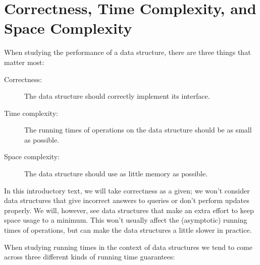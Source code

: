 \section{Correctness, Time Complexity, and Space Complexity}

When studying the performance of a data structure, there are three things that matter most:

\begin{description}
  \item[Correctness:] The data structure should correctly implement
    its interface.
  \item[Time complexity:] The running times of operations on the data
    structure should be as small as possible.
  \item[Space complexity:] The data structure should use as little memory
    as possible.
\end{description}


In this introductory text, we will take correctness as a given;  we won't consider data structures that give incorrect answers to queries or don't perform updates properly.  We will, however, see data structures that make an extra effort to keep space usage to a minimum.  This won't usually affect the (asymptotic) running times of operations, but can make the data structures a little slower in practice.

When studying running times in the context of data structures we tend to come across three different kinds of running time guarantees:

